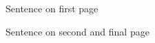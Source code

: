 \documentclass{article}
\begin{document}
    Sentence on first page

    \pagebreak

    Sentence on second and final page
\end{document}
